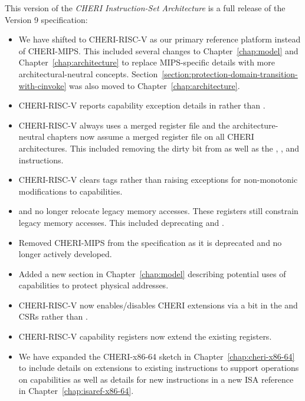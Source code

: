 This version of the \textit{CHERI Instruction-Set Architecture} is a full
release of the Version 9 specification:

\begin{itemize}
\item We have shifted to CHERI-RISC-V as our primary reference
  platform instead of CHERI-MIPS.  This included several changes to
  Chapter~\ref{chap:model} and Chapter~\ref{chap:architecture} to
  replace MIPS-specific details with more architectural-neutral
  concepts.
  Section~\ref{section:protection-domain-transition-with-cinvoke} was
  also moved to Chapter~\ref{chap:architecture}.

\item CHERI-RISC-V reports capability exception details in \xtval{}
  rather than \xccsr{}.

\item CHERI-RISC-V always uses a merged register file and the
  architecture-neutral chapters now assume a merged register file on
  all CHERI architectures.  This included removing the dirty bit from
  \xccsr{} as well as the , , and
   instructions.

\item CHERI-RISC-V clears tags rather than raising exceptions for
  non-monotonic modifications to capabilities.

\item \DDC{} and \PCC{} no longer relocate legacy memory accesses.
  These registers still constrain legacy memory accesses.  This
  included deprecating  and .

\item Removed CHERI-MIPS from the specification as it is deprecated
  and no longer actively developed.

\item Added a new section in Chapter~\ref{chap:model} describing
  potential uses of capabilities to protect physical addresses.

\item CHERI-RISC-V now enables/disables CHERI extensions via a bit in
  the \menvcfg{} and \senvcfg{} CSRs rather than \xccsr{}.

\item CHERI-RISC-V \xScratchC{} capability registers now extend the
  existing \xscratch{} registers.

\item We have expanded the CHERI-x86-64 sketch in
  Chapter~\ref{chap:cheri-x86-64} to include details on extensions to
  existing instructions to support operations on capabilities as well
  as details for new instructions in a new ISA reference in
  Chapter~\ref{chap:isaref-x86-64}.
\end{itemize}
